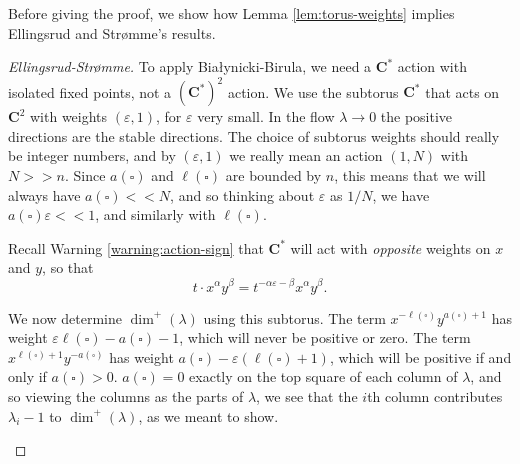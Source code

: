 \documentclass{amsart}[12pt]
\theoremstyle{definition}
\newcommand{\C}{\mathbf{C}}
\begin{document}
Before giving the proof,  we show how Lemma \ref{lem:torus-weights} implies Ellingsrud and Str\o mme's results. 

\begin{proof}[Ellingsrud-Str\o mme]

To apply Bia\l ynicki-Birula, we need a $\C^*$ action with isolated fixed points, not a $(\C^*)^2$ action.   We use the subtorus $\C^*$ that acts on $\C^2$ with weights $(\varepsilon,1)$, for $\varepsilon$ very small.  In the flow $\lambda\to 0$ the positive directions are the stable directions.  The choice of subtorus weights should really be integer numbers, and by $(\varepsilon, 1)$ we really mean an action $(1, N)$ with $N>>n$. Since $a(\square)$ and $\ell(\square)$ are bounded by $n$, this means that we will always have $a(\square)<<N$, and so thinking about $\varepsilon$ as $1/N$, we have $a(\square)\varepsilon<<1$, and similarly with $\ell(\square)$.

Recall Warning \ref{warning:action-sign} that $\C^*$ will act with \emph{opposite} weights on $x$ and $y$, so that $$t\cdot x^\alpha y^\beta=t^{-\alpha\varepsilon-\beta}x^\alpha y^\beta.$$  

We now determine $\dim^+(\lambda)$ using this subtorus.  The term $x^{-\ell(\square)} y^{a(\square)+1}$ has weight $\varepsilon\ell(\square)-a(\square)-1$, which will never be positive or zero.  The term $x^{\ell(\square)+1}y^{-a(\square)}$ has weight $a(\square)-\varepsilon(\ell(\square)+1)$, which will be positive if and only if $a(\square)>0$.  $a(\square)=0$ exactly on the top square of each column of $\lambda$, and so viewing the columns as the parts of $\lambda$, we see that the $i$th column contributes $\lambda_i-1$ to $\dim^+(\lambda)$, as we meant to show.



\begin{center}
\end{center}

\end{proof}
\end{document}
